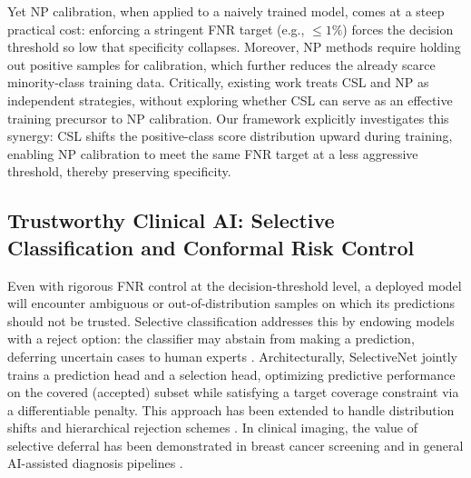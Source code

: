   Yet NP calibration, when applied to a naively trained model, comes at a steep practical cost: enforcing a stringent FNR target (e.g., $\leq 1\%$) forces the decision threshold so low that specificity      
  collapses. Moreover, NP methods require holding out positive samples for calibration, which further reduces the already scarce minority-class training data. Critically, existing work treats CSL and NP as
  independent strategies, without exploring whether CSL can serve as an effective training precursor to NP calibration. Our framework explicitly investigates this synergy: CSL shifts the positive-class score
   distribution upward during training, enabling NP calibration to meet the same FNR target at a less aggressive threshold, thereby preserving specificity.

  \subsection{Trustworthy Clinical AI: Selective Classification and Conformal Risk Control}                                                                                                                    
   
  Even with rigorous FNR control at the decision-threshold level, a deployed model will encounter ambiguous or out-of-distribution samples on which its predictions should not be trusted. Selective           
  classification addresses this by endowing models with a reject option: the classifier may abstain from making a prediction, deferring uncertain cases to human experts \cite{el2010foundations}.
  Architecturally, SelectiveNet \cite{geifman2019selectivenet, geifman2017selective} jointly trains a prediction head and a selection head, optimizing predictive performance on the covered (accepted) subset 
  while satisfying a target coverage constraint via a differentiable penalty. This approach has been extended to handle distribution shifts and hierarchical rejection schemes \cite{goren2024hierarchical}. In
   clinical imaging, the value of selective deferral has been demonstrated in breast cancer screening \cite{leibig2022combining} and in general AI-assisted diagnosis pipelines \cite{dvijotham2023enhancing}.

